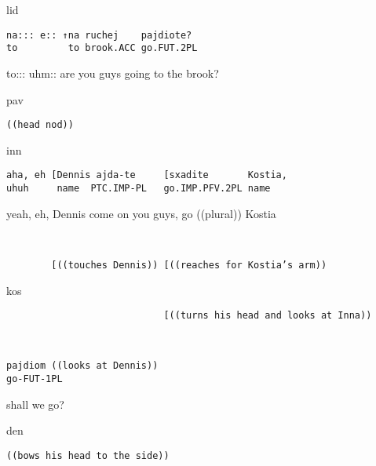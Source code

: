 \documentclass[output=paper,modfonts,nonflat]{langsci/langscibook}
\begin{document}
\vspace{2mm}
%
\begin{transbox}{1}{lid}
\begin{verbatim}
na::: e:: ↑na ruchej    pajdiote?
to         to brook.ACC go.FUT.2PL
\end{verbatim}
to::: uhm:: are you guys going to the brook?
\end{transbox}
%
\begin{transbox}{2}{pav}
\begin{verbatim}
((head nod))
\end{verbatim}
\end{transbox}
%
\begin{mdframednoverticalspace}[style=firstfoc]
\begin{transbox}{3}{inn}
\begin{verbatim}
aha, eh [Dennis ajda-te     [sxadite       Kostia,
uhuh     name  PTC.IMP-PL   go.IMP.PFV.2PL name
\end{verbatim}
yeah, eh, Dennis come on you guys, go ((plural)) Kostia
\end{transbox}
\end{mdframednoverticalspace}
%
\begin{transbox}{4}{~}
\begin{verbatim}
        [((touches Dennis)) [((reaches for Kostia’s arm))
\end{verbatim}
\end{transbox}
%
\begin{transbox}{5}{kos}
\begin{verbatim}
                            [((turns his head and looks at Inna))
\end{verbatim}
\end{transbox}
%
\begin{mdframednoverticalspace}[style=secondfoc]
\begin{transbox}{6}{~}
\begin{verbatim}
pajdiom ((looks at Dennis))
go-FUT-1PL
\end{verbatim}
shall we go?
\end{transbox}
\end{mdframednoverticalspace}
%
\begin{mdframednoverticalspace}[style=secondfoc]
\begin{transbox}{7}{den}
\begin{verbatim}
((bows his head to the side))
\end{verbatim}
\end{transbox}
\end{mdframednoverticalspace}
\end{document}
